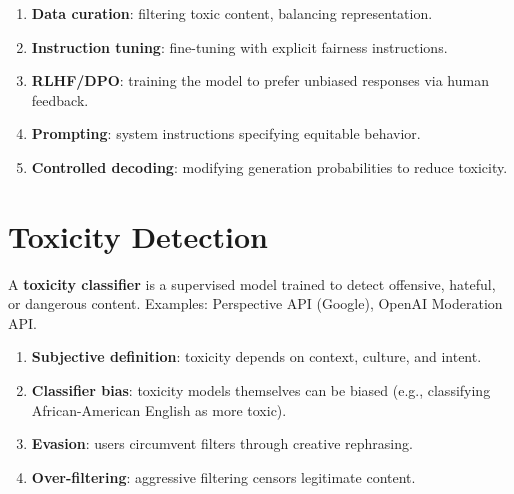 \begin{definition}
\begin{enumerate}
    \item \textbf{Data curation}: filtering toxic content, balancing
    representation.
    \item \textbf{Instruction tuning}: fine-tuning with explicit fairness
    instructions.
    \item \textbf{RLHF/DPO}: training the model to prefer unbiased
    responses via human feedback.
    \item \textbf{Prompting}: system instructions specifying equitable
    behavior.
    \item \textbf{Controlled decoding}: modifying generation
    probabilities to reduce toxicity.
\end{enumerate}
\end{definition}

\section{Toxicity Detection}
\label{sec:ethics:toxicity}

\begin{definition}
A \textbf{toxicity classifier} is a supervised model trained to detect
offensive, hateful, or dangerous content. Examples: Perspective API
(Google), OpenAI Moderation API.
\end{definition}

\begin{proposition}
\begin{enumerate}
    \item \textbf{Subjective definition}: toxicity depends on context,
    culture, and intent.
    \item \textbf{Classifier bias}: toxicity models themselves can be
    biased (e.g., classifying African-American English as more toxic).
    \item \textbf{Evasion}: users circumvent filters through creative
    rephrasing.
    \item \textbf{Over-filtering}: aggressive filtering censors
    legitimate content.
\end{enumerate}
\end{proposition}

